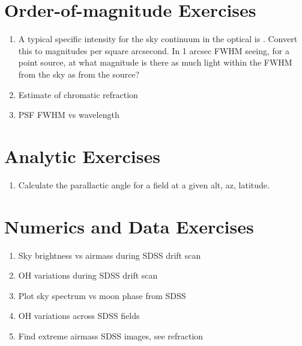 \citet{gunn06a}

\section{Order-of-magnitude Exercises}

\begin{enumerate} 
\item A typical specific intensity  for the sky continuum in the
    optical is . Convert this to magnitudes per square
    arcsecond. In 1 arcsec FWHM seeing, for a point source, at what
    magnitude is there as much light within the FWHM from the sky as
    from the source?
\item Estimate of chromatic refraction 
\item PSF FWHM vs wavelength
\end{enumerate} 

\section{Analytic Exercises}

\begin{enumerate}
\item Calculate the parallactic angle for a field at a given alt, az,
    latitude.
\end{enumerate}

\section{Numerics and Data Exercises}

\begin{enumerate}
\item Sky brightness vs airmass during SDSS drift scan
\item OH variations during SDSS drift scan
\item Plot sky spectrum vs moon phase from SDSS
\item OH variations across SDSS fields
\item Find extreme airmass SDSS images, see refraction
\end{enumerate}


  
